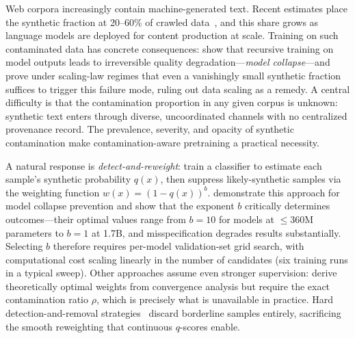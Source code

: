 Web corpora increasingly contain machine-generated text.
Recent estimates place the synthetic fraction at 20--60\% of crawled data~\citep{cheng_2025_contamination_survey}, and this share grows as language models are deployed for content production at scale.
Training on such contaminated data has concrete consequences: \citet{shumailov_2024_model_collapse} show that recursive training on model outputs leads to irreversible quality degradation---\emph{model collapse}---and \citet{dohmatob_2025_strong_collapse} prove under scaling-law regimes that even a vanishingly small synthetic fraction suffices to trigger this failure mode, ruling out data scaling as a remedy.
A central difficulty is that the contamination proportion in any given corpus is unknown: synthetic text enters through diverse, uncoordinated channels with no centralized provenance record.
The prevalence, severity, and opacity of synthetic contamination make contamination-aware pretraining a practical necessity.

A natural response is \emph{detect-and-reweight}: train a classifier to estimate each sample's synthetic probability $q(x)$, then suppress likely-synthetic samples via the weighting function $w(x) = (1 - q(x))^b$.
\citet{drayson_2025_detection_collapse} demonstrate this approach for model collapse prevention and show that the exponent $b$ critically determines outcomes---their optimal values range from $b{=}10$ for models at ${\leq}360$M parameters to $b{=}1$ at 1.7B, and misspecification degrades results substantially.
Selecting $b$ therefore requires per-model validation-set grid search, with computational cost scaling linearly in the number of candidates (six training runs in a typical sweep).
Other approaches assume even stronger supervision: \citet{he_2025_golden_ratio} derive theoretically optimal weights from convergence analysis but require the exact contamination ratio $\rho$, which is precisely what is unavailable in practice.
Hard detection-and-removal strategies~\citep{feng_2025_beyond_collapse} discard borderline samples entirely, sacrificing the smooth reweighting that continuous $q$-scores enable.

